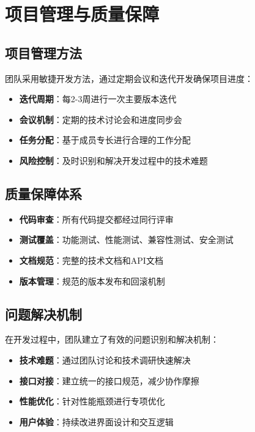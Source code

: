 \documentclass[a4paper]{article}
\begin{document}
\section{项目管理与质量保障}

\subsection{项目管理方法}

团队采用敏捷开发方法，通过定期会议和迭代开发确保项目进度：

\begin{itemize}
    \item \textbf{迭代周期}：每2-3周进行一次主要版本迭代
    \item \textbf{会议机制}：定期的技术讨论会和进度同步会
    \item \textbf{任务分配}：基于成员专长进行合理的工作分配
    \item \textbf{风险控制}：及时识别和解决开发过程中的技术难题
\end{itemize}

\subsection{质量保障体系}

\begin{itemize}
    \item \textbf{代码审查}：所有代码提交都经过同行评审
    \item \textbf{测试覆盖}：功能测试、性能测试、兼容性测试、安全测试
    \item \textbf{文档规范}：完整的技术文档和API文档
    \item \textbf{版本管理}：规范的版本发布和回滚机制
\end{itemize}

\subsection{问题解决机制}

在开发过程中，团队建立了有效的问题识别和解决机制：

\begin{itemize}
    \item \textbf{技术难题}：通过团队讨论和技术调研快速解决
    \item \textbf{接口对接}：建立统一的接口规范，减少协作摩擦
    \item \textbf{性能优化}：针对性能瓶颈进行专项优化
    \item \textbf{用户体验}：持续改进界面设计和交互逻辑
\end{itemize}
\end{document}
